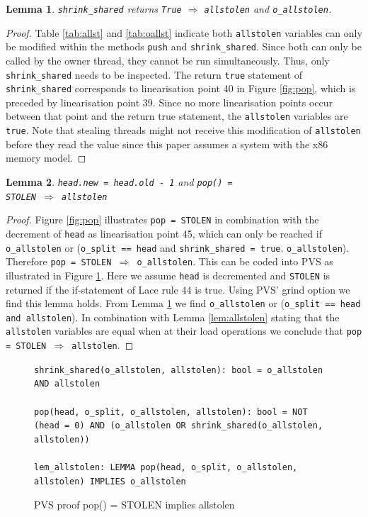\documentclass{sig-alternate-br}
\newtheorem{lemma}{Lemma}
\begin{document}
\begin{lemma}
	\texttt{shrink\_shared} returns \texttt{True} $\Rightarrow$ \texttt{allstolen} and \texttt{o\_allstolen}.
	\label{lem:shrinkshared}
\end{lemma}
\begin{proof}
	Table \ref{tab:allst} and \ref{tab:oallst} indicate both \texttt{allstolen} variables can only be modified within the methods \texttt{push} and \texttt{shrink\_shared}. Since both can only be called by the owner thread, they cannot be run simultaneously.  Thus, only \texttt{shrink\_shared} needs to be inspected. The return \texttt{true} statement of \texttt{shrink\_shared} corresponds to linearisation point 40 in Figure \ref{fig:pop}, which is preceded by linearisation point 39. Since no more linearisation points occur between that point and the return true statement, the \texttt{allstolen} variables are \texttt{true}. Note that stealing threads might not receive this modification of \texttt{allstolen} before they read the value since this paper assumes a system with the x86 memory model.
\end{proof}

\begin{lemma}
	\texttt{head.new = head.old - 1} and \texttt{pop() =\\ STOLEN $\Rightarrow$ \texttt{allstolen}}
	\label{lem:popstolen}
\end{lemma}
\begin{proof}
	Figure \ref{fig:pop} illustrates \texttt{pop = STOLEN} in combination with the decrement of \texttt{head} as linearisation point 45, which can only be reached if \texttt{o\_allstolen} or (\texttt{o\_split == head} and \texttt{shrink\_shared = true}.
	\texttt{o\_allstolen}). Therefore \texttt{pop = STOLEN $\Rightarrow$ o\_allstolen}. This can be coded into PVS as illustrated in Figure \ref{pvs:popallstolen}. Here we assume \texttt{head} is decremented and \texttt{STOLEN} is returned if the if-statement of Lace rule 44 is true. Using PVS' grind option we find this lemma holds. From Lemma \ref{lem:shrinkshared} we find \texttt{o\_allstolen} or (\texttt{o\_split == head and allstolen}).
	In combination with Lemma \ref{lem:allstolen} stating that the \texttt{allstolen} variables are equal when at their load operations we conclude that \texttt{pop = STOLEN $\Rightarrow$ allstolen}.
\end{proof}
\begin{figure}[h]
	\texttt{shrink\_shared(o\_allstolen, allstolen): bool = o\_allstolen AND allstolen}\\\\
	\texttt{pop(head, o\_split, o\_allstolen, allstolen): bool = NOT (head = 0) AND (o\_allstolen OR shrink\_shared(o\_allstolen, allstolen))}\\\\
	\texttt{lem\_allstolen: LEMMA pop(head, o\_split, o\_allstolen, allstolen) IMPLIES o\_allstolen}
	\caption{PVS proof pop() = STOLEN implies allstolen}
	\label{pvs:popallstolen}
\end{figure}
\end{document}
